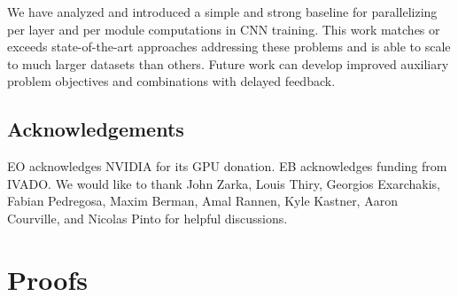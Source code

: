 \documentclass{article}
\begin{document}
We have analyzed and introduced a simple and strong baseline for parallelizing per layer and per module computations in CNN training. This work matches or exceeds state-of-the-art approaches addressing these problems and is able to scale to much larger datasets than others. Future work can develop improved auxiliary problem objectives and combinations with delayed feedback.
\subsection*{Acknowledgements}
EO acknowledges NVIDIA for its GPU donation. EB acknowledges funding from IVADO. We would like to thank John Zarka, Louis Thiry, Georgios Exarchakis, Fabian Pedregosa, Maxim Berman, Amal Rannen,  Kyle Kastner, Aaron Courville, and Nicolas Pinto for helpful discussions.
%



\newpage
\appendix
\onecolumn



\section{Proofs}
\label{sec:app_proofs}
\setcounter{section}{4}
\setcounter{prop}{0}
\setcounter{lemma}{0}
\renewcommand{\thelemma}{\arabic{section}.\arabic{lemma}}
\renewcommand{\theprop}{\arabic{section}.\arabic{lemma}}
\end{document}
